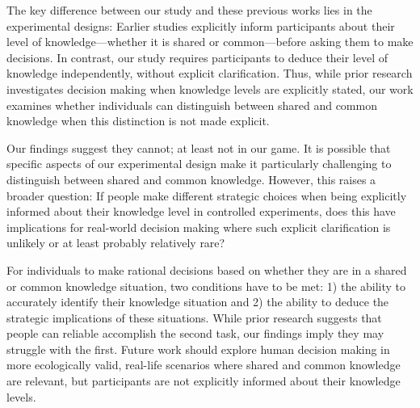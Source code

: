 The key difference between our study and these previous works lies in the experimental designs: Earlier studies explicitly inform participants about their level of knowledge---whether it is shared or common---before asking them to make decisions. In contrast, our study requires participants to deduce their level of knowledge independently, without explicit clarification. 
Thus, while prior research investigates %
decision making when knowledge levels are explicitly stated, our work examines whether individuals can distinguish between shared and common knowledge when this distinction is not made explicit. 

Our findings suggest they cannot; at least not in our game. It is possible that 
specific aspects of our %
experimental design make it particularly challenging to distinguish between shared and common knowledge. %
However, this raises a broader question: If people make different strategic choices when being explicitly informed about %
their knowledge level in controlled experiments, %
does this have implications for real-world decision making %
where such explicit clarification is unlikely or at least probably relatively rare?

For individuals to make rational decisions based on %
whether they are in a shared or common knowledge situation, %
two conditions have to be met: 1) the ability to accurately identify %
their knowledge situation %
and 2) the ability to deduce the strategic implications of these %
situations. 
While prior research suggests that %
people %
can reliable accomplish the %
second task, our findings imply they %
may struggle with the first. %
Future work %
should explore human decision making in more ecologically valid, real-life scenarios where shared and common knowledge are relevant, %
but %
participants are not explicitly informed about their knowledge levels.

